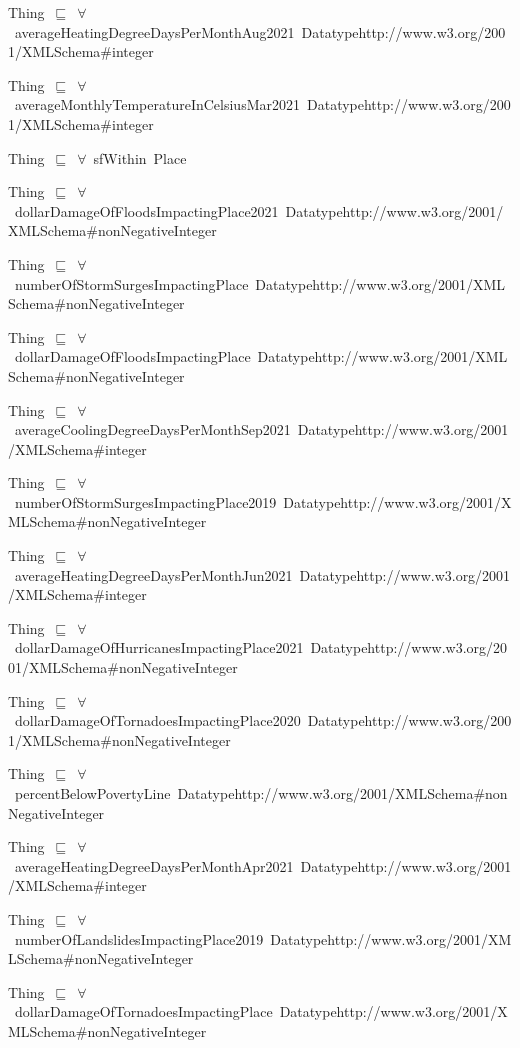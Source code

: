 \documentclass{article}
\begin{document}
Thing~\ensuremath{\sqsubseteq}~\ensuremath{\forall}~averageHeatingDegreeDaysPerMonthAug2021~Datatypehttp://www.w3.org/2001/XMLSchema#integer~

Thing~\ensuremath{\sqsubseteq}~\ensuremath{\forall}~averageMonthlyTemperatureInCelsiusMar2021~Datatypehttp://www.w3.org/2001/XMLSchema#integer~

Thing~\ensuremath{\sqsubseteq}~\ensuremath{\forall}~sfWithin~Place~

Thing~\ensuremath{\sqsubseteq}~\ensuremath{\forall}~dollarDamageOfFloodsImpactingPlace2021~Datatypehttp://www.w3.org/2001/XMLSchema#nonNegativeInteger~

Thing~\ensuremath{\sqsubseteq}~\ensuremath{\forall}~numberOfStormSurgesImpactingPlace~Datatypehttp://www.w3.org/2001/XMLSchema#nonNegativeInteger~

Thing~\ensuremath{\sqsubseteq}~\ensuremath{\forall}~dollarDamageOfFloodsImpactingPlace~Datatypehttp://www.w3.org/2001/XMLSchema#nonNegativeInteger~

Thing~\ensuremath{\sqsubseteq}~\ensuremath{\forall}~averageCoolingDegreeDaysPerMonthSep2021~Datatypehttp://www.w3.org/2001/XMLSchema#integer~

Thing~\ensuremath{\sqsubseteq}~\ensuremath{\forall}~numberOfStormSurgesImpactingPlace2019~Datatypehttp://www.w3.org/2001/XMLSchema#nonNegativeInteger~

Thing~\ensuremath{\sqsubseteq}~\ensuremath{\forall}~averageHeatingDegreeDaysPerMonthJun2021~Datatypehttp://www.w3.org/2001/XMLSchema#integer~

Thing~\ensuremath{\sqsubseteq}~\ensuremath{\forall}~dollarDamageOfHurricanesImpactingPlace2021~Datatypehttp://www.w3.org/2001/XMLSchema#nonNegativeInteger~

Thing~\ensuremath{\sqsubseteq}~\ensuremath{\forall}~dollarDamageOfTornadoesImpactingPlace2020~Datatypehttp://www.w3.org/2001/XMLSchema#nonNegativeInteger~

Thing~\ensuremath{\sqsubseteq}~\ensuremath{\forall}~percentBelowPovertyLine~Datatypehttp://www.w3.org/2001/XMLSchema#nonNegativeInteger~

Thing~\ensuremath{\sqsubseteq}~\ensuremath{\forall}~averageHeatingDegreeDaysPerMonthApr2021~Datatypehttp://www.w3.org/2001/XMLSchema#integer~

Thing~\ensuremath{\sqsubseteq}~\ensuremath{\forall}~numberOfLandslidesImpactingPlace2019~Datatypehttp://www.w3.org/2001/XMLSchema#nonNegativeInteger~

Thing~\ensuremath{\sqsubseteq}~\ensuremath{\forall}~dollarDamageOfTornadoesImpactingPlace~Datatypehttp://www.w3.org/2001/XMLSchema#nonNegativeInteger~
\end{document}
